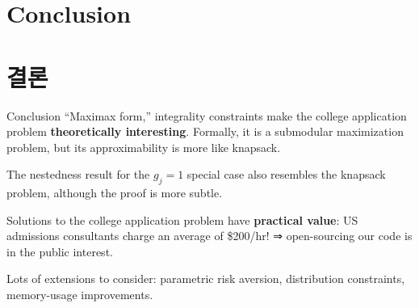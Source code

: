 \documentclass[11pt,slidestop,compress,mathserif,notheorems]{beamer}
\theoremstyle{definition}
\theoremstyle{definition}
\begin{document}
\ifen \section{Conclusion} \else \section{결론} \fi

  \fi






\begin{frame}{Conclusion}
``Maximax form,'' integrality constraints make the college application problem \textbf{theoretically interesting}. Formally, it is a submodular maximization problem, but its approximability is more like knapsack.

The nestedness result for the $g_j = 1$ special case also resembles the knapsack problem, although the proof is more subtle. 

Solutions to the college application problem have \textbf{practical value}: US admissions consultants charge an average of \$200/hr! ⇒ open-sourcing our code is in the public interest.

Lots of extensions to consider: parametric risk aversion, distribution constraints, memory-usage improvements.
\end{frame}
\end{document}
